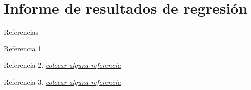 \section{Informe de resultados de regresión}
\begin{frame}{Referencias}
	\begin{thebibliography}{00}
		\beamertemplatebookbibitems
		Referencia 1
		
		\beamertemplateonlinebibitems
		Referencia 2. \href{}{\em colocar alguna referencia}
		
		\beamertemplatearticlebibitems
		Referencia 3. \href{}{\em colocar alguna referencia}
	\end{thebibliography}
\end{frame}